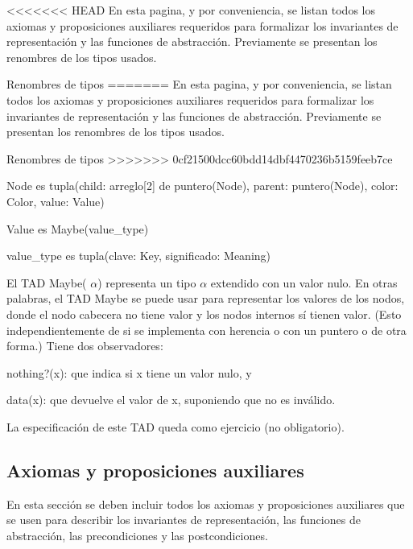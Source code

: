 <<<<<<< HEAD
\-En esta pagina, y por conveniencia, se listan todos los axiomas y proposiciones auxiliares requeridos para formalizar los invariantes de representación y las funciones de abstracción. \-Previamente se presentan los renombres de los tipos usados.

\begin{DoxyParagraph}{\-Renombres de tipos}
=======
En esta pagina, y por conveniencia, se listan todos los axiomas y proposiciones auxiliares requeridos para formalizar los invariantes de representación y las funciones de abstracción. Previamente se presentan los renombres de los tipos usados.

\begin{DoxyParagraph}{Renombres de tipos}
>>>>>>> 0cf21500dcc60bdd14dbf4470236b5159feeb7ce

\end{DoxyParagraph}

\begin{DoxyItemize}
\item Node es tupla(child\+: arreglo\mbox{[}2\mbox{]} de puntero(\+Node), parent\+: puntero(\+Node), color\+: Color, value\+: Value)
\item Value es Maybe(value\+\_\+type)
\item value\+\_\+type es tupla(clave\+: Key, significado\+: Meaning)
\end{DoxyItemize}

El T\+AD Maybe( $\alpha$) representa un tipo $\alpha$ extendido con un valor nulo. En otras palabras, el T\+AD Maybe se puede usar para representar los valores de los nodos, donde el nodo cabecera no tiene valor y los nodos internos sí tienen valor. (Esto independientemente de si se implementa con herencia o con un puntero o de otra forma.) Tiene dos observadores\+:
\begin{DoxyItemize}
\item nothing?(x)\+: que indica si x tiene un valor nulo, y
\item data(x)\+: que devuelve el valor de x, suponiendo que no es inválido.
\end{DoxyItemize}

La especificación de este T\+AD queda como ejercicio (no obligatorio).\hypertarget{axiomas_sec-Axiomas}{}\subsection{Axiomas y proposiciones auxiliares}\label{axiomas_sec-Axiomas}
En esta sección se deben incluir todos los axiomas y proposiciones auxiliares que se usen para describir los invariantes de representación, las funciones de abstracción, las precondiciones y las postcondiciones.


\end{DoxyParagraph}

